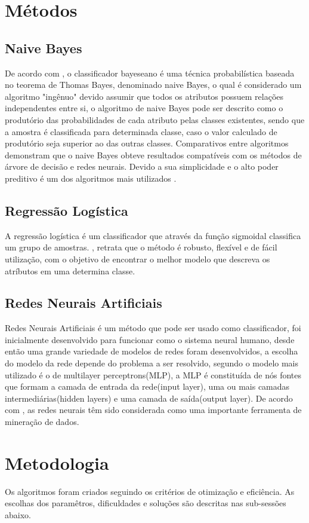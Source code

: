 \documentclass[10pt, conference, compsocconf]{IEEEtran}
\begin{document}
\section{Métodos}\label{metodos}
\subsection{Naive Bayes}
De acordo com \cite{4}, o classificador bayeseano é uma técnica probabilística baseada no teorema de Thomas Bayes, denominado naive Bayes, o qual é considerado um algoritmo "ingênuo" devido assumir que todos os atributos possuem relações independentes entre si, o algoritmo de naive Bayes pode ser descrito como o produtório das probabilidades de cada atributo pelas classes existentes, sendo que a amostra é classificada para determinada classe, caso o valor calculado de produtório seja superior ao das outras classes. Comparativos entre algoritmos demonstram que o naive Bayes obteve resultados compatíveis com os métodos de árvore de decisão e redes neurais. Devido a sua simplicidade e o alto poder preditivo é um dos algoritmos mais utilizados \cite{5}.
 
\subsection{Regressão Logística}
A regressão logística é um classificador que através da função sigmoidal classifica um grupo de amostras. \cite{6}, retrata que o método é robusto, flexível e de fácil utilização, com o objetivo de encontrar o melhor modelo que descreva os atríbutos em uma determina classe.

\subsection{Redes Neurais Artificiais}
Redes Neurais Artificiais é um método que pode ser usado como classificador, foi inicialmente desenvolvido para funcionar como o sistema neural humano, desde então uma grande variedade de modelos de redes foram desenvolvidos, a escolha do modelo da rede depende do problema a ser resolvido, segundo \cite{7} o modelo mais utilizado é o de multilayer perceptrons(MLP), a MLP é constituída de nós fontes que formam a camada de entrada da rede(input layer), uma ou mais camadas intermediárias(hidden layers) e uma camada de saída(output layer). De acordo com \cite{11}, as redes neurais têm sido considerada como uma importante ferramenta de mineração de dados. 

\section{Metodologia}\label{metodologia}
Os algoritmos foram criados seguindo os critérios de otimização e eficiência. As escolhas dos paramêtros, dificuldades e soluções são descritas nas sub-sessões abaixo.
\end{document}
